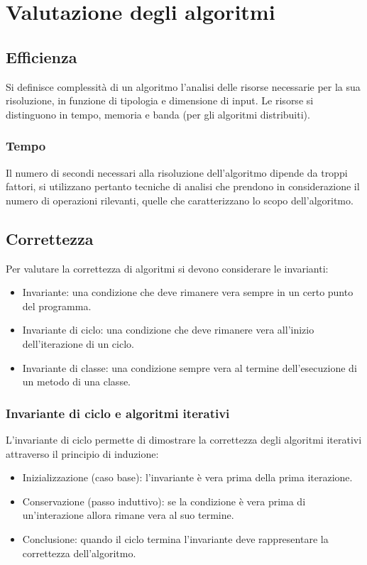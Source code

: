 \section{Valutazione degli algoritmi}
\subsection{Efficienza}
Si definisce complessit\`a di un algoritmo l'analisi delle risorse necessarie per la sua
risoluzione, in funzione di tipologia e dimensione di input. Le risorse si distinguono in tempo,
memoria e banda (per gli algoritmi distribuiti).
\subsubsection{Tempo}
Il numero di secondi necessari alla risoluzione dell'algoritmo dipende da troppi fattori, si
utilizzano pertanto tecniche di analisi che prendono in considerazione il numero di operazioni
rilevanti, quelle che caratterizzano lo scopo dell'algoritmo.
\subsection{Correttezza}
Per valutare la correttezza di algoritmi si devono considerare le invarianti:
\begin{itemize}
	\item Invariante: una condizione che deve rimanere vera sempre in un certo punto del programma.
	\item Invariante di ciclo: una condizione che deve rimanere vera all'inizio dell'iterazione di un ciclo.
	\item Invariante di classe: una condizione sempre vera al termine dell'esecuzione di un metodo di una
	      classe.
\end{itemize}
\subsubsection{Invariante di ciclo e algoritmi iterativi}
L'invariante di ciclo permette di dimostrare la correttezza degli algoritmi iterativi attraverso il
principio di induzione:
\begin{itemize}
	\item Inizializzazione (caso base): l'invariante \`e vera prima della prima iterazione.
	\item Conservazione (passo induttivo): se la condizione \`e vera prima di un'interazione allora rimane
	      vera al suo termine.
	\item Conclusione: quando il ciclo termina l'invariante deve rappresentare la correttezza dell'algoritmo.
\end{itemize}